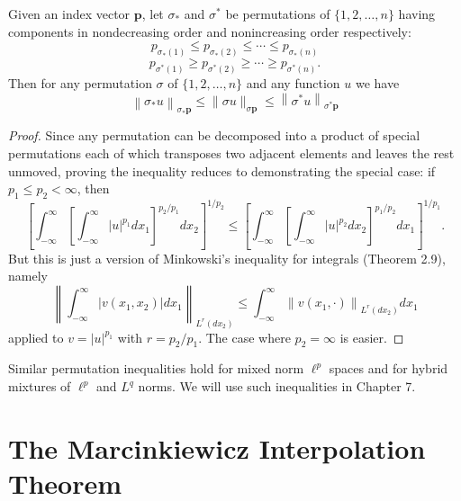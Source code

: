 \begin{theorem}
  Given an index vector $\mathbf{p}$, let $\sigma_*$ and $\sigma^*$ be permutations of $\{1,2, \ldots, n\}$ having components in nondecreasing order and nonincreasing order respectively:
  \[
  p_{\sigma_*(1)} \leq p_{\sigma_*(2)} \leq \cdots \leq p_{\sigma_*(n)}
  \]
  \[
  p_{\sigma^*(1)} \geq p_{\sigma^*(2)} \geq \cdots \geq p_{\sigma^*(n)} .
  \]
  Then for any permutation $\sigma$ of $\{1,2, \ldots, n\}$ and any function $u$ we have
  \[
  \left\|\sigma_* u\right\|_{\sigma_* \mathbf{p}} \leq\|\sigma u\|_{\sigma \mathbf{p}} \leq\left\|\sigma^* u\right\|_{\sigma^* \mathbf{p}}
  \]
\end{theorem}

\begin{proof}
  Since any permutation can be decomposed into a product of special permutations each of which transposes two adjacent elements and leaves the rest unmoved, proving the inequality reduces to demonstrating the special case: if $p_1 \leq p_2<\infty$, then
  \[
  \left[\int_{-\infty}^{\infty}\left[\int_{-\infty}^{\infty}|u|^{p_1} d x_1\right]^{p_2 / p_1} d x_2\right]^{1 / p_2} \leq\left[\int_{-\infty}^{\infty}\left[\int_{-\infty}^{\infty}|u|^{p_2} d x_2\right]^{p_1 / p_2} d x_1\right]^{1 / p_1} .
  \]
  But this is just a version of Minkowski's inequality for integrals (Theorem 2.9), namely
  \[
  \left\|\int_{-\infty}^{\infty}\left|v\left(x_1, x_2\right)\right| d x_1\right\|_{L^r\left(d x_2\right)} \leq \int_{-\infty}^{\infty}\left\|v\left(x_1, \cdot\right)\right\|_{L^r\left(d x_2\right)} d x_1
  \]
  applied to $v=|u|^{p_1}$ with $r=p_2 / p_1$. The case where $p_2=\infty$ is easier.
\end{proof}


\begin{remark}
  Similar permutation inequalities hold for mixed norm $\ell^p$ spaces and for hybrid mixtures of $\ell^p$ and $L^q$ norms. We will use such inequalities in Chapter 7.
\end{remark}


\section{The Marcinkiewicz Interpolation Theorem}



